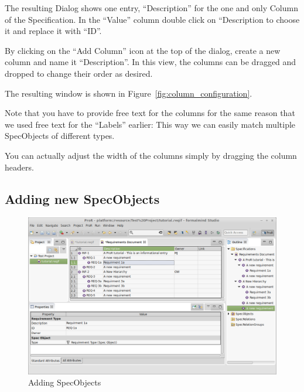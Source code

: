 The resulting Dialog shows one entry, ``Description'' for the one and only Column of the Specification.  In the ``Value'' column double click on ``Description to choose it and replace it with ``ID''.

By clicking on the ``Add Column'' icon at the top of the dialog, create a new column and name it ``Description''.  In this view, the columns can be dragged and dropped to change their order as desired.

The resulting window is shown in Figure~\ref{fig:column_configuration}.

\begin{info}
Note that you have to provide free text for the columns for the same reason that we used free text for the ``Labels'' earlier: This way we can easily match multiple SpecObjects of different types.
\end{info}

You can actually adjust the width of the columns simply by dragging the column headers.

\subsection{Adding new SpecObjects}
\label{sec:add-specobjects}

\begin{figure}
\centering
\includegraphics[width=\linewidth]{../rmf-images/hierarchy_example.png}      
\caption{Adding SpecObjects}      
\label{fig:requirements_hierarchy}
\end{figure}

